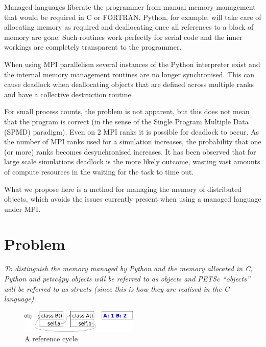 \documentclass[10pt,journal,compsoc]{IEEEtran}
\begin{document}
Managed languages liberate the programmer from manual memory management that would be required in C or FORTRAN.
Python, for example, will take care of allocating memory as required and deallocating once all references to a block of memory are gone.
Such routines work perfectly for serial code and the inner workings are completely transparent to the programmer.

When using MPI parallelism several instances of the Python interpreter exist and the internal memory management routines are no longer synchronised.
This can cause deadlock when deallocating objects that are defined across multiple ranks and have a collective destruction routine.

For small process counts, the problem is not apparent, but this does not mean that the program is correct (in the sense of the Single Program Multiple Data (SPMD) paradigm).
Even on 2 MPI ranks it is possible for deadlock to occur.
As the number of MPI ranks used for a simulation increases, the probability that one (or more) ranks becomes desynchronised increases.
It has been observed that for large scale simulations deadlock is the more likely outcome, wasting vast amounts of compute resources in the waiting for the task to time out.

What we propose here is a method for managing the memory of distributed objects, which avoids the issues currently present when using a managed language under MPI.



\section{Problem}
\label{sec:problem}


\emph{To distinguish the memory managed by Python and the memory allocated in C, Python and petsc4py objects will be referred to as objects and PETSc ``objects'' will be referred to as structs (since this is how they are realised in the C language).}

\begin{figure}
	\includegraphics[width=0.5\textwidth]{gc_generational/2.png}
	\caption{A reference cycle}
	\label{fig:ref_cycle}
\end{figure}
\end{document}
